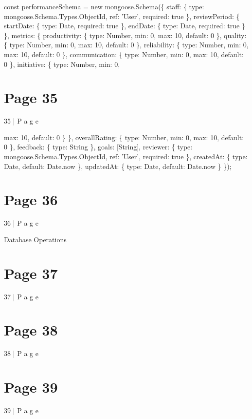 \documentclass{article}
\begin{document}
 
const performanceSchema = new mongoose.Schema(\{ 
  staff: \{ 
    type: mongoose.Schema.Types.ObjectId, 
    ref: 'User', 
    required: true 
  \}, 
  reviewPeriod: \{ 
    startDate: \{ 
      type: Date, 
      required: true 
    \}, 
    endDate: \{ 
      type: Date, 
      required: true 
    \} 
  \}, 
  metrics: \{ 
    productivity: \{ 
      type: Number, 
      min: 0, 
      max: 10, 
      default: 0 
    \}, 
    quality: \{ 
      type: Number, 
      min: 0, 
      max: 10, 
      default: 0 
    \}, 
    reliability: \{ 
      type: Number, 
      min: 0, 
      max: 10, 
      default: 0 
    \}, 
    communication: \{ 
      type: Number, 
      min: 0, 
      max: 10, 
      default: 0 
    \}, 
    initiative: \{ 
      type: Number, 
      min: 0, 

\section*{Page 35}
35 | P a g e 
 
      max: 10, 
      default: 0 
    \} 
  \}, 
  overallRating: \{ 
    type: Number, 
    min: 0, 
    max: 10, 
    default: 0 
  \}, 
  feedback: \{ 
    type: String 
  \}, 
  goals: [String], 
  reviewer: \{ 
    type: mongoose.Schema.Types.ObjectId, 
    ref: 'User', 
    required: true 
  \}, 
  createdAt: \{ 
    type: Date, 
    default: Date.now 
  \}, 
  updatedAt: \{ 
    type: Date, 
    default: Date.now 
  \} 
\}); 
 
 

\section*{Page 36}
36 | P a g e 
 
Database Operations 
 


\section*{Page 37}
37 | P a g e 
 
 


\section*{Page 38}
38 | P a g e 
 
 


\section*{Page 39}
39 | P a g e 
 
\end{document}
